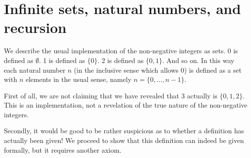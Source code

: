 \documentclass[12pt]{article}
\begin{document}
\section{Infinite sets, natural numbers, and recursion}

We describe the usual implementation of the non-negative integers as sets.  0 is defined as $\emptyset$.  1 is defined as $\{0\}$.  2 is defined as $\{0,1\}$.  And so on.  In this way each natural number $n$ (in the inclusive sense which allows 0) is defined as a set with $n$ elements in the usual sense, namely $n = \{0,\dots,n-1\}$.

First of all, we are not claiming that we have revealed that 3 actually is $\{0,1,2\}$.  This is an implementation, not a revelation of the true nature of the non-negative integers.

Secondly, it would be good to be rather suspicious as to whether a definition has actually been given!  We proceed to show that this definition
can indeed be given formally, but it requires another axiom.
\end{document}
